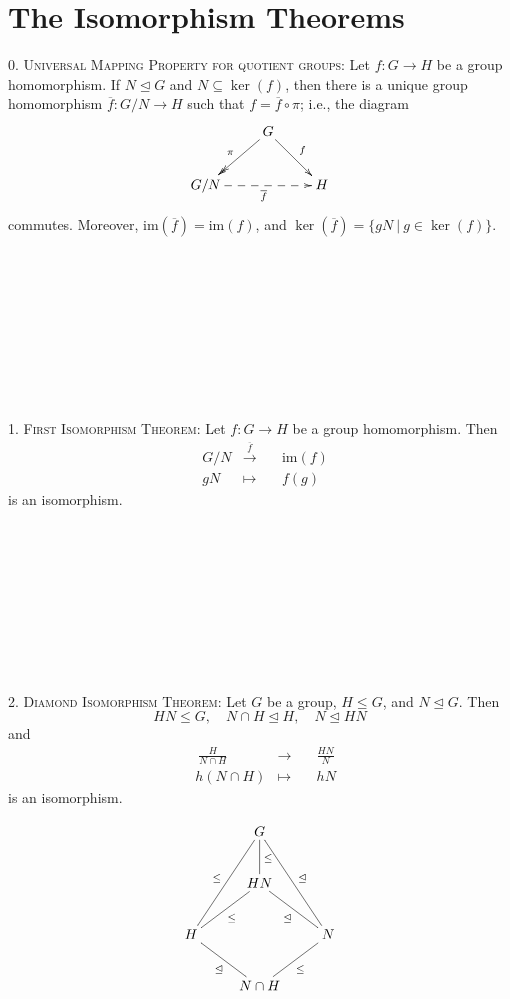 \documentclass[12pt]{amsart}
\newcommand{\showsol}[1]{\def\displaysol{#1}}
\begin{document}
\showsol{0}
	
	\thispagestyle{empty}
	
	\section*{The Isomorphism Theorems}
	
	

\begin{framed}
\textsc{0. Universal Mapping Property for quotient groups:} Let $f:G\to H$ be a group homomorphism. If $N \trianglelefteq G$ and $N\subseteq \ker(f)$, then there is a unique group homomorphism $\overline{f}: G/N \to H$ such that $f= \overline{f} \circ \pi$; i.e., the diagram
$$\xymatrix{& G \ar@{->>}[ld]_\pi \ar[rd]^f  & \\
G/N \ar@{-->}[rr]_{\overline{f}}  && H \\}$$
commutes. Moreover, $\mathrm{im}(\overline{f}) = \mathrm{im}(f)$, and $\ker(\overline{f}) = \{ gN \ | \ g\in \ker(f)\}$.

\ 

 \
 
 \ 
 
 \
 
 \

\textsc{1. First Isomorphism Theorem:} Let $f:G\to H$ be a group homomorphism. Then 
\[\begin{aligned} &G/N &\xrightarrow{\overline{f}} & \quad \mathrm{im}(f)\\ 
& gN &\mapsto &\quad f(g)\end{aligned}\] 
is an isomorphism.

\ 

 \
 
 \ 
 
 \
 
 \

\textsc{2. Diamond Isomorphism Theorem:} Let $G$ be a group, $H \leq G$, and $N \trianglelefteq G$. Then 
$$HN \leq G, \quad N \cap H \trianglelefteq H, \quad N \trianglelefteq HN$$ 
and 
\[\begin{aligned} & \ \frac{H}{N \cap H} &\longrightarrow & \quad \frac{HN}{N}\\ 
& h(N\cap H) &\mapsto &\quad hN \end{aligned}\] 
is an isomorphism.

\[
\xymatrix{
    &G\ar@{-}[d]^{\le}\ar@{-}[ddl]_{\le}\ar@{-}[ddr]^{\trianglelefteq}&\\
    &HN\ar@{-}[dl]^{\le}\ar@{-}[dr]_{\trianglelefteq}&\\
    H\ar@{-}[dr]_{\trianglelefteq}&&N\ar@{-}[dl]^{\le}\\
    &N \cap H&
    }\]


\end{framed}
\end{document}
